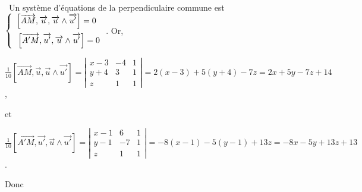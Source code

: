 {{\textbullet~Un système d'équations de la perpendiculaire commune est 
$\left\{
\begin{array}{l}
\left[\overrightarrow{AM},\overrightarrow{u},\overrightarrow{u}\wedge\overrightarrow{u'}\right]=0\\
\rule{0mm}{6mm}\left[\overrightarrow{A'M},\overrightarrow{u'},\overrightarrow{u}\wedge\overrightarrow{u'}\right]=0
\end{array}
\right.$. Or,

\begin{center}
$\frac{1}{10}\left[\overrightarrow{AM},\overrightarrow{u},\overrightarrow{u}\wedge\overrightarrow{u'}\right]=\left|
\begin{array}{ccc}
x-3&-4&1\\
y+4&3&1\\
z&1&1
\end{array}
\right|=2(x-3)+5(y+4)-7z=2x+5y-7z+14$,
\end{center}
et

\begin{center}
$\frac{1}{10}\left[\overrightarrow{A'M},\overrightarrow{u'},\overrightarrow{u}\wedge\overrightarrow{u'}\right]=\left|
\begin{array}{ccc}
x-1&6&1\\
y-1&-7&1\\
z&1&1
\end{array}
\right|=-8(x-1)-5(y-1)+13z=-8x-5y+13z+13$.
\end{center}
Donc

\begin{center}
\end{center}
}
}
